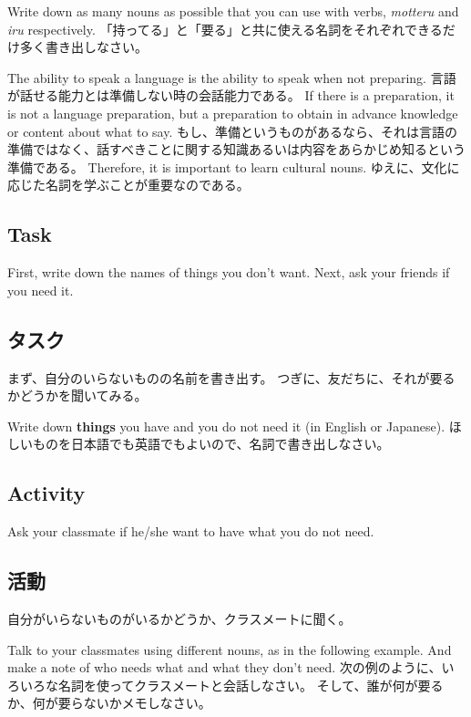 \documentclass[uplatex,dvipdfmx,b5paper,english,10pt]{jsbook}
\begin{document}
\begin{toiquestion}
 \ifEnglish
 Write down as many nouns as possible that you can use with verbs, {\it motteru\/} and {\it iru\/} respectively.
 \else
 「持ってる」と「要る」と共に使える名詞をそれぞれできるだけ多く書き出しなさい。
 \fi
\end{toiquestion}

\ifEnglish
The ability to speak a language is the ability to speak when not preparing.
\else
言語が話せる能力とは準備しない時の会話能力である。
\fi
\ifEnglish
If there is a preparation, it is not a language preparation, but a preparation to obtain in advance knowledge or content about what to say.
\else
もし、準備というものがあるなら、それは言語の準備ではなく、話すべきことに関する知識あるいは内容をあらかじめ知るという準備である。
\fi
\ifEnglish
Therefore, it is important to learn cultural nouns.
\else
ゆえに、文化に応じた名詞を学ぶことが重要なのである。
\fi

\ifEnglish
\subsection{Task}
First, write down the names of things you don't want.
Next, ask your friends if you need it.
\else
\subsection{タスク}
まず、自分のいらないものの名前を書き出す。
つぎに、友だちに、それが要るかどうかを聞いてみる。
\fi
\begin{toiquestion}
\ifEnglish
Write down {\bfseries things} you have and you do not need it (in English or Japanese).
\else
ほしいものを日本語でも英語でもよいので、名詞で書き出しなさい。
\fi
\end{toiquestion}

\ifEnglish
\subsection{Activity}
Ask your classmate if he/she want to have what you do not need.
\else
\subsection{活動}
自分がいらないものがいるかどうか、クラスメートに聞く。
\fi

\begin{toiquestion}
\ifEnglish
Talk to your classmates using different nouns, as in the following example.
And make a note of who needs what and what they don't need.
\else
次の例のように、いろいろな名詞を使ってクラスメートと会話しなさい。
そして、誰が何が要るか、何が要らないかメモしなさい。
\fi
\end{toiquestion}
\end{document}
